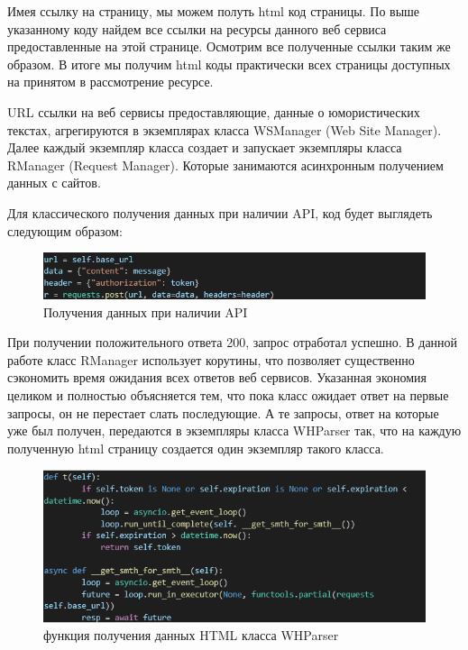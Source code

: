 Имея ссылку на страницу, мы можем полуть html код страницы. По выше указанному коду найдем все ссылки на ресурсы данного веб 
сервиса предоставленные на этой странице. Осмотрим все полученные ссылки таким же образом. В итоге мы получим html коды 
практически всех страницы доступных на принятом в рассмотрение ресурсе.

URL ссылки на веб сервисы предоставляющие, данные о юмористических текстах, агрегируются в экземплярах класса WSManager 
(Web Site Manager). Далее каждый экземпляр класса создает и запускает экземпляры класса RManager (Request Manager). 
Которые занимаются асинхронным получением данных с сайтов.    

Для классического получения данных при наличии API, код будет выглядеть следующим образом:

\begin{figure}[H]
\includegraphics[width=0.75\columnwidth]{./img/code_block_2.png}
\centering
\caption{Получения данных при наличии API}
\label{pic:code_block_2.png}
\end{figure}

При получении положительного ответа 200, запрос отработал успешно.
В данной работе класс RManager использует корутины, что позволяет существенно сэкономить время ожидания всех ответов веб сервисов. 
Указанная экономия целиком и полностью объясняется тем, что пока класс ожидает ответ на первые запросы, он не перестает слать последующие. 
А те запросы, ответ на которые уже был получен, передаются в экземпляры класса  WHParser так, что на каждую полученную html страницу 
создается один экземпляр такого класса.

\begin{figure}[H]
\includegraphics[width=0.75\columnwidth]{./img/code_block_3.png}
\centering
\caption{функция получения данных HTML класса WHParser}
\label{pic:code_block_3.png}
\end{figure}
  

